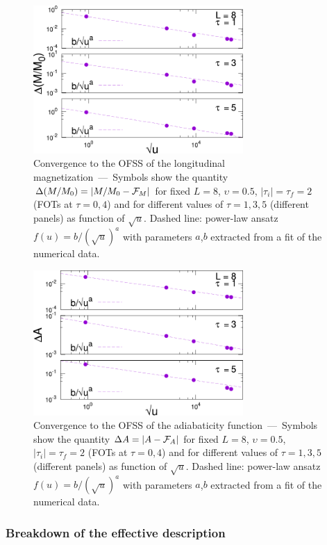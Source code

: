 	\begin{figure}[t]
\centering
		\includegraphics[width=8cm]{imm/sqrtuMconv.pdf}
\caption{Convergence to the OFSS of the longitudinal magnetization~---~Symbols show the quantity $\Delta(M/M_0)=|M/M_0-{\cal F}_M|$ for fixed $L=8$, $\upsilon=0.5$, $|\tau_i|=\tau_f=2$ (FOTs at $\tau=0,4$) and for different values of $\tau=1,3,5$ (different panels) as function of $\sqrt{u}$. Dashed line: power-law ansatz $f(u)=b/(\sqrt{u})^a$ with parameters $a$,$b$ extracted from a fit of the numerical data.}\label{fig:convergence-M}
	\end{figure}
\begin{figure}[t]
\centering
	\includegraphics[width=8cm]{imm/sqrtuAconv.pdf}
		\caption{Convergence to the OFSS of the adiabaticity function~---~Symbols show the quantity $\Delta A=|A-{\cal F}_A|$ for fixed $L=8$, $\upsilon=0.5$, $|\tau_i|=\tau_f=2$ (FOTs at $\tau=0,4$) and for different values of $\tau=1,3,5$ (different panels) as function of $\sqrt{u}$. Dashed line: power-law ansatz $f(u)=b/(\sqrt{u})^a$ with parameters $a$,$b$ extracted from a fit of the numerical data.}
		\label{fig:convergence-A}
	\end{figure}
\subsubsection{Breakdown of the effective description}\label{sec:break}


